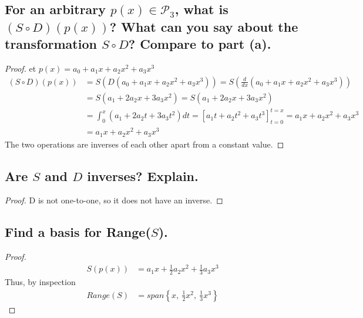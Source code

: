 \documentclass[../main.tex]{subfiles}
\begin{document}
\subsection{For an arbitrary $p(x) \in \mathcal{P}_3$, what is $(S \circ D)(p(x))$? What can you say about the transformation $S \circ D$? Compare to part (a).}
\begin{proof}
        et $\displaystyle p( x) =a_{0} +a_{1} x+a_{2} x^{2} +a_{3} x^{3}$
        \begin{align*}
                ( S\circ D)( p( x)) & =S\left( D\left( a_{0} +a_{1} x+a_{2} x^{2} +a_{3} x^{3}\right)\right) =S\left(\frac{d}{dx}\left( a_{0} +a_{1} x+a_{2} x^{2} +a_{3} x^{3}\right)\right)  \\
                                    & =S\left( a_{1} +2a_{2} x+3a_{3} x^{2}\right) =S\left( a_{1} +2a_{2} x+3a_{3} x^{2}\right)                                                                \\
                                    & =\int _{0}^{x}\left( a_{1} +2a_{2} t+3a_{3} t^{2}\right) dt=\left[ a_{1} t+a_{2} t^{2} +a_{3} t^{3}\right]_{t=0}^{t=x} =a_{1} x+a_{2} x^{2} +a_{3} x^{3} \\
                                    & =a_{1} x+a_{2} x^{2} +a_{3} x^{3}
        \end{align*}
        The two operations are inverses of each other apart from a constant value.
\end{proof}
\subsection{Are $S$ and $D$ inverses? Explain.}
\begin{proof}
        D is not one-to-one, so it does not have an inverse.
\end{proof}
\subsection{Find a basis for Range($S$).}
\begin{proof}
        \begin{align*}
                S( p( x)) & =a_{1} x+\frac{1}{2} a_{2} x^{2} +\frac{1}{3} a_{3} x^{3}
        \end{align*}
        Thus, by inspection
        \begin{align*}
                Range( S) & =span\left\{x,\ \frac{1}{2} x^{2} ,\ \frac{1}{3} x^{3}\right\}
        \end{align*}
\end{proof}
\end{document}
